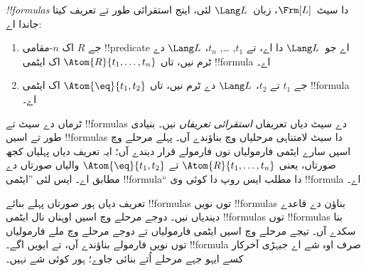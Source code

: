 \documentclass[../../../include/open-logic-section]{subfiles}
\begin{document}
\begin{defn}[فارمولے]
\emph{!!{formula}s} دا سیٹ~$\Frm[L]$، زبان~$\Lang L$ لئی،
اینج استقرائی طور تے تعریف کیتا جاندا اے:
\begin{enumerate}


\item جے $R$ اک $n$-مقامی !!{predicate} اے جو~$\Lang L$ دا اے، تے $t_1$, \dots,
  $t_n$، $\Lang L$ دے ٹرم نیں، تاں $\Atom{R}{t_1,\ldots, t_n}$ اک
  ایٹمی !!{formula} اے۔

\item جے $t_1$ تے $t_2$، $\Lang L$ دے ٹرم نیں، تاں $\Atom{\eq}{t_1, t_2}$
  اک ایٹمی !!{formula} اے۔








\end{enumerate}
\end{defn}

\begin{explain}
ٹرماں دے سیٹ تے !!{formula}s دے سیٹ دیاں تعریفاں
\emph{استقرائی تعریفاں} نیں۔ بنیادی طور تے اسیں
!!{formula}s دا سیٹ لامتناہی مرحلیاں وچ بناؤندے آں۔
پہلے مرحلے وچ اسیں سارے ایٹمی فارمولیاں نوں فارمولے
قرار دیندے آں؛ ایہ تعریف دیاں پہلیاں کجھ صورتاں، یعنی
%
%
$\Atom{R}{t_1,\dots,t_n}$ تے $\Atom{\eq}{t_1,t_2}$
والیاں صورتاں دے مطابق اے۔ ایس لئی ”ایٹمی
!!{formula}“ دا مطلب ایس روپ دا کوئی وی !!{formula} اے۔

تعریف دیاں ہور صورتاں پہلے بنائے !!{formula}s توں
نویں !!{formula}s بناؤن دے قاعدے دیندیاں نیں۔
دوجے مرحلے وچ اسیں اوہناں نال ایٹمی !!{formula}s توں
!!{formula}s بنا سکدے آں۔ تیجے مرحلے وچ اسیں ایٹمی
فارمولیاں تے دوجے مرحلے وچ ملے فارمولیاں توں نویں
فارمولے بناؤندے آں، تے ایویں اگے۔ !!{formula} صرف
اوہ شے اے جیہڑی آخرکار کسے ایہو جہے مرحلے اُتے
بنائی جاوے؛ ہور کوئی شے نہیں۔
\end{explain}
\end{document}
